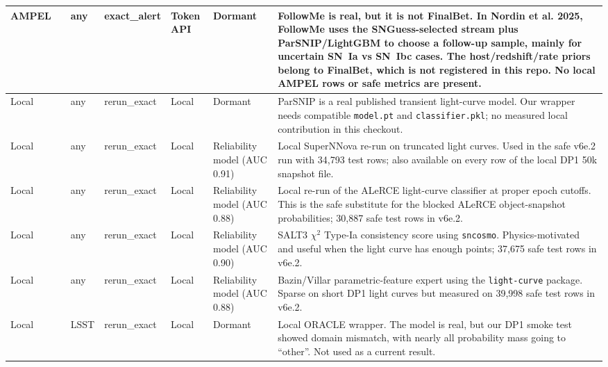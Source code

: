 \documentclass[11pt]{article}
\newcommand{\code}[1]{\texttt{#1}}
\begin{document}
\begin{landscape}
\begin{longtable}{L{1.7cm} L{5.7cm} L{1.15cm} L{1.85cm} L{1.3cm} L{2.45cm} L{5.35cm}}
AMPEL &  & any & exact\_alert & Token API & Dormant & FollowMe is real, but it is not FinalBet. In Nordin et al. 2025, FollowMe uses the SNGuess-selected stream plus ParSNIP/LightGBM to choose a follow-up sample, mainly for uncertain SN~Ia vs SN~Ibc cases. The host/redshift/rate priors belong to FinalBet, which is not registered in this repo. No local AMPEL rows or safe metrics are present.\\
\midrule
Local &  & any & rerun\_exact & Local & Dormant & ParSNIP is a real published transient light-curve model. Our wrapper needs compatible \code{model.pt} and \code{classifier.pkl}; no measured local contribution in this checkout.\\
Local &  & any & rerun\_exact & Local & Reliability model (AUC 0.91) & Local SuperNNova re-run on truncated light curves. Used in the safe v6e.2 run with 34{,}793 test rows; also available on every row of the local DP1 50k snapshot file.\\
Local &  & any & rerun\_exact & Local & Reliability model (AUC 0.88) & Local re-run of the ALeRCE light-curve classifier at proper epoch cutoffs. This is the safe substitute for the blocked ALeRCE object-snapshot probabilities; 30{,}887 safe test rows in v6e.2.\\
Local &  & any & rerun\_exact & Local & Reliability model (AUC 0.90) & SALT3 \(\chi^{2}\) Type-Ia consistency score using \code{sncosmo}. Physics-motivated and useful when the light curve has enough points; 37{,}675 safe test rows in v6e.2.\\
Local &  & any & rerun\_exact & Local & Reliability model (AUC 0.88) & Bazin/Villar parametric-feature expert using the \code{light-curve} package. Sparse on short DP1 light curves but measured on 39{,}998 safe test rows in v6e.2.\\
Local &  & LSST & rerun\_exact & Local & Dormant & Local ORACLE wrapper. The model is real, but our DP1 smoke test showed domain mismatch, with nearly all probability mass going to ``other''. Not used as a current result.\\

\bottomrule
\end{longtable}
\normalsize
\end{landscape}
\end{document}
